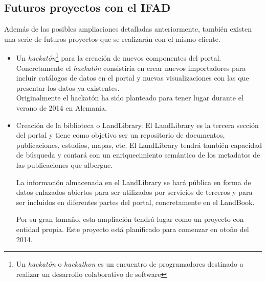 \subsection{Futuros proyectos con el IFAD}
	Además de las posibles ampliaciones detalladas anteriormente, también existen una
	serie de futuros proyectos que se realizarán con el mismo cliente.
	\begin{itemize}
		\item Un \textit{hackatón}\footnote{Un \textit{hackatón} o \textit{hackathon} es un encuentro de programadores destinado a realizar un desarrollo colaborativo de software} para la creación de nuevos componentes del portal.  Concretamente
		el \textit{hackatón} consistiría en crear nuevos importadores para incluir catálogos de
		datos en el portal y nuevas visualizaciones con las que presentar los datos
		ya existentes.\\
		Originalmente el hackatón ha sido planteado para tener lugar durante el verano
		de 2014 en Alemania.
		
		\item Creación de la biblioteca o LandLibrary.  El LandLibrary es la tercera
		sección del portal y tiene como objetivo ser un repositorio de documentos,
		publicaciones, estudios, mapas, etc.  El LandLibrary tendrá también	capacidad
		de búsqueda y contará con un enriquecimiento semántico de los metadatos de
		las publicaciones que albergue.
		
		La información almacenada en el LandLibrary se hará pública en forma de
		datos enlazados abiertos para ser utilizados por servicios de terceros y 
		para ser incluidos en diferentes partes del portal, concretamente en el
		LandBook.
		
		Por su gran tamaño, esta ampliación tendrá lugar como un proyecto con
		entidad propia.  Este proyecto está planificado para comenzar en otoño
		del 2014.
		
	\end{itemize}

